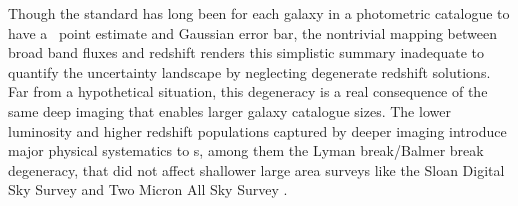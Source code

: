 
Though the standard has long been for each galaxy in a photometric catalogue to have a \pz\ point estimate and Gaussian error bar, the nontrivial mapping between broad band fluxes and redshift renders this simplistic summary inadequate to quantify the uncertainty landscape by neglecting degenerate redshift solutions.
Far from a hypothetical situation, this degeneracy is a real consequence of the same deep imaging that enables larger galaxy catalogue sizes.
The lower luminosity and higher redshift populations captured by deeper imaging introduce major physical systematics to \pz s, among them the Lyman break/Balmer break degeneracy, that did not affect shallower large area surveys like the Sloan Digital Sky Survey \citep[\textsc{SDSS},][]{York:00} and Two Micron All Sky Survey \citep[\textsc{2MASS},][]{Skrutskie:06}.

